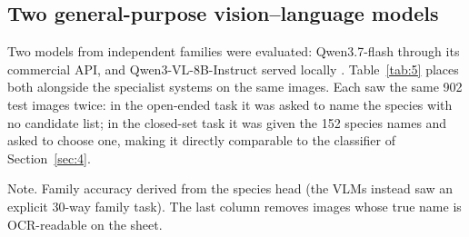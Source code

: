 \documentclass[preprint,12pt,authoryear]{elsarticle}
\begin{document}
\subsection{Two general-purpose vision--language models}\label{sec:7.2}

Two models from independent families were evaluated: Qwen3.7-flash through its commercial API, and Qwen3-VL-8B-Instruct served locally \citep{bai2025}. Table~\ref{tab:5} places both alongside the specialist systems on the same images. Each saw the same 902 test images twice: in the open-ended task it was asked to name the species with no candidate list; in the closed-set task it was given the 152 species names and asked to choose one, making it directly comparable to the classifier of Section~\ref{sec:4}.

\begin{table}[tbp]
\centering
\caption{All systems on the same 902-image test split}
\label{tab:5}
\par\vspace{3pt}
\noindent\begin{minipage}{\linewidth}\footnotesize
Note. \dag{} Family accuracy derived from the species head (the VLMs instead saw an explicit 30-way family task). The last column removes images whose true name is OCR-readable on the sheet.
\end{minipage}
\end{table}
\end{document}
